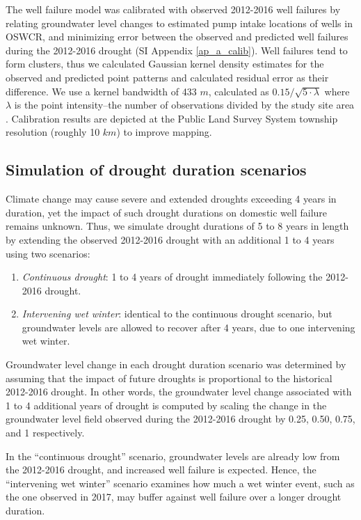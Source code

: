 The well failure model was calibrated with observed 2012-2016 well failures by relating groundwater level changes to estimated pump intake locations of wells in OSWCR, and minimizing error between the observed and predicted well failures during the 2012-2016 drought (SI Appendix \ref{ap_a_calib}). Well failures tend to form clusters, thus we calculated Gaussian kernel density estimates for the observed and predicted point patterns and calculated residual error as their difference. We use a kernel bandwidth of 433 $m$, calculated as $0.15 / \sqrt{5 \cdot \lambda}$ where $\lambda$ is the point intensity--the number of observations divided by the study site area \citep{stoyan1994fractals}. Calibration results are depicted at the Public Land Survey System \citep{us2009manual} township resolution (roughly 10 $km$) to improve mapping.




\subsection{Simulation of drought duration scenarios}

Climate change may cause severe and extended droughts exceeding 4 years in duration, yet the impact of such drought durations on domestic well failure remains unknown. Thus, we simulate drought durations of 5 to 8 years in length by extending the observed 2012-2016 drought with an additional 1 to 4 years using two scenarios:  

\begin{enumerate}
	\item \textit{Continuous drought}: 1 to 4 years of drought immediately following the 2012-2016 drought.
	\item \textit{Intervening wet winter}: identical to the continuous drought scenario, but groundwater levels are allowed to recover after 4 years, due to one intervening wet winter. 
\end{enumerate}

Groundwater level change in each drought duration scenario was determined by assuming that the impact of future droughts is proportional to the historical 2012-2016 drought. In other words, the groundwater level change associated with 1 to 4 additional years of drought is computed by scaling the change in the groundwater level field observed during the 2012-2016 drought by 0.25, 0.50, 0.75, and 1 respectively. 

In the ``continuous drought'' scenario, groundwater levels are already low from the 2012-2016 drought, and increased well failure is expected. Hence, the ``intervening wet winter'' scenario examines how much a wet winter event, such as the one observed in 2017, may buffer against well failure over a longer drought duration.  



